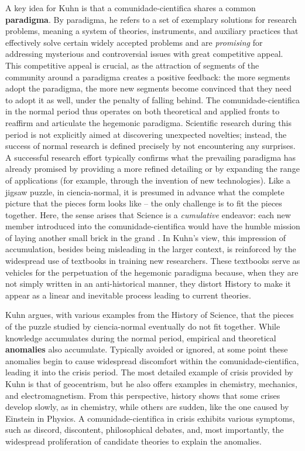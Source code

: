 \documentclass[./main_en.tex]{subfiles}
\begin{document}
\par A key idea for Kuhn is that a \gls{comunidade-cientifica} shares a common \textbf{\gls{paradigma}}. By \gls{paradigma}, he refers to a set of exemplary solutions for research problems, meaning a \gls{system} of theories, instruments, and auxiliary practices that effectively solve certain widely accepted problems and are \textit{promising} for addressing mysterious and controversial issues with great competitive appeal. This competitive appeal is crucial, as the attraction of segments of the community around a \gls{paradigma} creates a positive \gls{feedback}: the more segments adopt the \gls{paradigma}, the more new segments become convinced that they need to adopt it as well, under the penalty of falling behind. The \gls{comunidade-cientifica} in the normal period thus operates on both theoretical and applied fronts to reaffirm and articulate the hegemonic \gls{paradigma}. Scientific research during this period is not explicitly aimed at discovering unexpected novelties; instead, the success of normal research is defined precisely by not encountering any surprises. A successful research effort typically confirms what the prevailing \gls{paradigma} has already promised by providing a more refined detailing or by expanding the range of applications (for example, through the invention of new technologies). Like a jigsaw puzzle, in \gls{ciencia-normal}, it is presumed in advance what the complete picture that the pieces form looks like – the only challenge is to fit the pieces together. Here, the sense arises that Science is a \textit{cumulative} endeavor: each new member introduced into the \gls{comunidade-cientifica} would have the humble mission of laying another small brick in the grand . In Kuhn's view, this impression of accumulation, besides being misleading in the larger context, is reinforced by the widespread use of textbooks in training new researchers. These textbooks serve as vehicles for the perpetuation of the hegemonic \gls{paradigma} because, when they are not simply written in an anti-historical manner, they distort History to make it appear as a linear and inevitable process leading to current theories.

\par Kuhn argues, with various examples from the History of Science, that the pieces of the puzzle studied by \gls{ciencia-normal} eventually do not fit together. While knowledge accumulates during the normal period, empirical and theoretical \textbf{anomalies} also accumulate. Typically avoided or ignored, at some point these anomalies begin to cause widespread discomfort within the \gls{comunidade-cientifica}, leading it into the crisis period. The most detailed example of crisis provided by Kuhn is that of geocentrism, but he also offers examples in chemistry, mechanics, and electromagnetism. From this perspective, history shows that some crises develop slowly, as in chemistry, while others are sudden, like the one caused by Einstein in Physics. A \gls{comunidade-cientifica} in crisis exhibits various symptoms, such as discord, discontent, philosophical debates, and, most importantly, the widespread proliferation of candidate theories to explain the anomalies.
\end{document}
